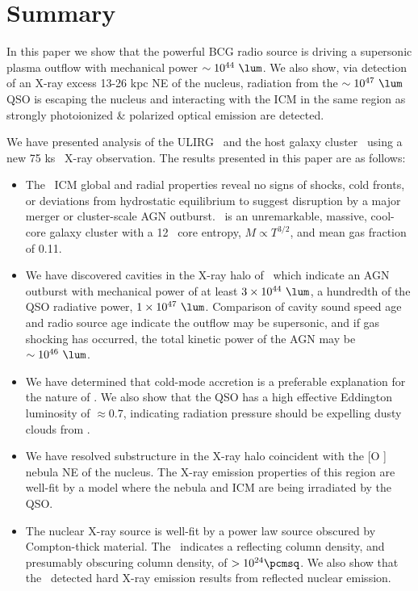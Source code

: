 \documentclass[useAMS,usenatbib]{mn2e}
\begin{document}
\section{Summary}
\label{sec:summ}

In this paper we show that the powerful BCG radio source is driving a
supersonic plasma outflow with mechanical power $\sim 10^{44}
~\lum$. We also show, via detection of an X-ray excess 13-26 kpc NE of
the nucleus, radiation from the $\sim 10^{47} ~\lum$ QSO is escaping
the nucleus and interacting with the ICM in the same region as
strongly photoionized \& polarized optical emission are detected.

We have presented analysis of the ULIRG \iras\ and the host galaxy
cluster \rxj\ using a new 75 ks \chandra\ X-ray observation. The
results presented in this paper are as follows:
\begin{itemize}
\item The \rxj\ ICM global and radial properties reveal no signs of
  shocks, cold fronts, or deviations from hydrostatic equilibrium to
  suggest disruption by a major merger or cluster-scale AGN
  outburst. \rxj\ is an unremarkable, massive, cool-core galaxy
  cluster with a 12 \ent\ core entropy, $M \propto T^{3/2}$, and mean
  gas fraction of 0.11.
\item We have discovered cavities in the X-ray halo of \irs\ which
  indicate an AGN outburst with mechanical power of at least $3 \times
  10^{44} ~\lum$, a hundredth of the QSO radiative power, $1 \times
  10^{47} ~\lum$. Comparison of cavity sound speed age and radio
  source age indicate the outflow may be supersonic, and if gas
  shocking has occurred, the total kinetic power of the AGN may be
  $\sim 10^{46} ~\lum$.
\item We have determined that cold-mode accretion is a preferable
  explanation for the nature of \irs. We also show that the QSO has a
  high effective Eddington luminosity of $\approx 0.7$, indicating
  radiation pressure should be expelling dusty clouds from \irs.
\item We have resolved substructure in the X-ray halo coincident with
  the [O ] nebula NE of the nucleus. The X-ray emission
  properties of this region are well-fit by a model where the nebula
  and ICM are being irradiated by the QSO.
\item The nuclear X-ray source is well-fit by a power law source
  obscured by Compton-thick material. The \fekaew\ indicates a
  reflecting column density, and presumably obscuring column density,
  of $> 10^{24} \pcmsq$. We also show that the \bepposax\ detected
  hard X-ray emission results from reflected nuclear emission.
\end{itemize}
\end{document}
